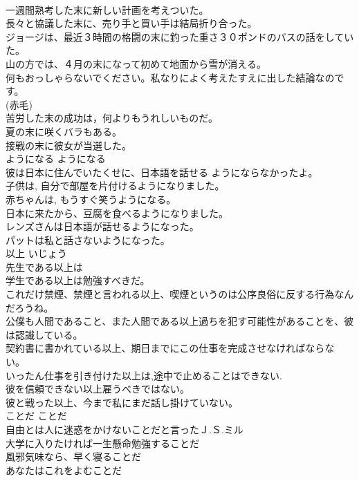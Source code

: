 \documentclass[8pt]{extreport}
\begin{document}
\begin{CJK}{UTF8}{min}
\\	一週間熟考した末に新しい計画を考えついた。  
\\	長々と協議した末に、売り手と買い手は結局折り合った。  
\\	ジョージは、最近３時間の格闘の末に釣った重さ３０ポンドのバスの話をしていた。  
\\	山の方では、４月の末になって初めて地面から雪が消える。  
\\	何もおっしゃらないでください。私なりによく考えたすえに出した結論なのです。  
\\	(赤毛)
\\	苦労した末の成功は，何よりもうれしいものだ。   
\\	夏の末に咲くバラもある。   
\\	接戦の末に彼女が当選した。   
\\	ようになる	ようになる	
\\	彼は日本に住んでいたくせに、日本語を話せる ようにならなかったよ。  
\\	子供は, 自分で部屋を片付けるようになりました。  
\\	赤ちゃんは, もうすぐ笑うようになる。  
\\	日本に来たから、豆腐を食べるようになりました。  
\\	レンズさんは日本語が話せるようになった。  
\\	パットは私と話さないようになった。  
\\	以上	いじょう	
\\	先生である以上は  
\\	学生である以上は勉強すべきだ。  
\\	これだけ禁煙、禁煙と言われる以上、喫煙というのは公序良俗に反する行為なんだろうね。  
\\	公僕も人間であること、また人間である以上過ちを犯す可能性があることを、彼は認識している。  
\\	契約書に書かれている以上、期日までにこの仕事を完成させなければならない。  
\\	いったん仕事を引き付けた以上は,途中で止めることはできない.  
\\	彼を信頼できない以上雇うべきではない。  
\\	彼と戦った以上、今まで私にまだ話し掛けていない。  
\\	ことだ	ことだ	
\\	自由とは人に迷惑をかけないことだと言ったＪ.Ｓ.ミル  
\\	大学に入りたければ一生懸命勉強することだ  
\\	風邪気味なら、早く寝ることだ  
\\	あなたはこれをよむことだ  

\end{CJK}
\end{document}
